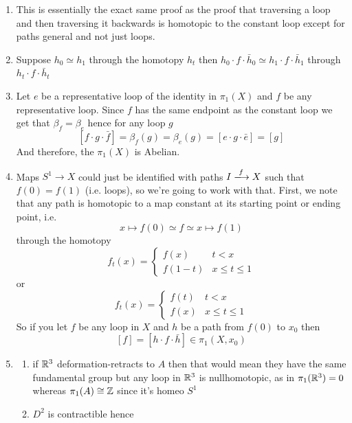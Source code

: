 \documentclass{article}
\begin{document}
\begin{homeworkProblem}
    \begin{enumerate}[label=1.1.\arabic*]
        \item This is essentially the exact same proof as the proof that traversing a loop and then traversing it backwards is homotopic to the constant loop except for paths general and not just loops.
        \item Suppose $h_0\simeq h_1$ through the homotopy $h_t$ then $h_0\cdot f\cdot\bar{h}_0\simeq h_1 \cdot f \cdot \bar{h}_1$ through $h_t \cdot f \cdot \bar{h}_t$
        \item Let $e$ be a representative loop of the identity in $\pi_1(X)$ and $f$ be any representative loop. Since $f$ has the same endpoint as the constant loop we get that $\beta_f = \beta_e$ hence for any loop $g$
        \[[f \cdot g \cdot \bar{f}] = \beta_f(g) = \beta_e(g) = [e \cdot g \cdot \bar{e}] = [g]\]
        And therefore, the $\pi_1(X)$ is Abelian.
        \setcounter{enumi}{5}
        \item Maps $S^1 \to X$ could just be identified with paths $I \xlongrightarrow{f} X$ such that $f(0) = f(1)$ (i.e. loops), so we're going to work with that. First, we note that any path is homotopic to a map constant at its starting point or ending point, i.e.
        \[x \mapsto f(0) \simeq f \simeq x \mapsto f(1)\]
        through the homotopy
        \[f_t(x) =
        \begin{cases}
            f(x) & t<x \\
            f(1-t) & x \leq t \leq 1
        \end{cases}
        \]
        or 
        \[f_t(x) =
        \begin{cases}
            f(t) & t<x \\
            f(x) & x \leq t \leq 1
        \end{cases}
        \]
        So if you let $f$ be any loop in $X$ and $h$ be a path from $f(0)$ to $x_0$ then
        \[[f] = [h \cdot f \cdot \bar{h}] \in \pi_1(X, x_0)\] 
        \setcounter{enumi}{15}
        \item 
        \begin{enumerate}
            \item if $\mathbb{R}^3$ deformation-retracts to $A$ then that would mean they have the same fundamental group but any loop in $\mathbb{R}^3$ is nullhomotopic, as in $\pi_1(\mathbb{R}^3) = 0$ whereas $\pi_1(A) \cong \mathbb{Z}$ since it's homeo $S^1$
            \item $D^2$ is contractible hence

\end{enumerate}
\end{enumerate}
\end{homeworkProblem}
\end{document}
